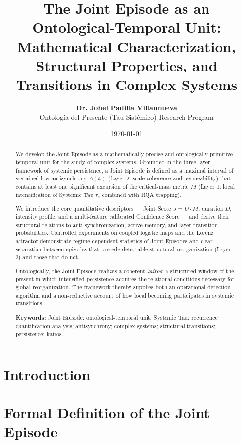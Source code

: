 \documentclass[11pt,a4paper]{article}
\title{\textbf{The Joint Episode as an Ontological-Temporal Unit:}\\[0.25em]
\large Mathematical Characterization, Structural Properties, and Transitions in Complex Systems}
\author{
    \textbf{Dr. Johel Padilla Villaunueva}\\[0.2em]
    \small Ontología del Presente (Tau Sistémico) Research Program
}
\date{\today}
\begin{document}
\maketitle

\begin{abstract}
\noindent
We develop the Joint Episode as a mathematically precise and ontologically primitive temporal unit for the study of complex systems. Grounded in the three-layer framework of systemic persistence, a Joint Episode is defined as a maximal interval of sustained low antisynchrony $A(k)$ (Layer 2: scale coherence and permeability) that contains at least one significant excursion of the critical-mass metric $M$ (Layer 1: local intensification of Systemic Tau $\tau_s$ combined with RQA trapping). 

We introduce the core quantitative descriptors — Joint Score $J = D \cdot \overline{M}$, duration $D$, intensity profile, and a multi-feature calibrated Confidence Score — and derive their structural relations to anti-synchronization, active memory, and layer-transition probabilities. Controlled experiments on coupled logistic maps and the Lorenz attractor demonstrate regime-dependent statistics of Joint Episodes and clear separation between episodes that precede detectable structural reorganization (Layer 3) and those that do not.

Ontologically, the Joint Episode realizes a coherent \textit{kairos}: a structured window of the present in which intensified persistence acquires the relational conditions necessary for global reorganization. The framework thereby supplies both an operational detection algorithm and a non-reductive account of how local becoming participates in systemic transitions.

\vspace{0.1em}
\noindent\textbf{Keywords:} Joint Episode; ontological-temporal unit; Systemic Tau; recurrence quantification analysis; antisynchrony; complex systems; structural transitions; persistence; kairos.
\end{abstract}

\vspace{0.5em}

\section{Introduction}


\section{Formal Definition of the Joint Episode}

\end{document}
